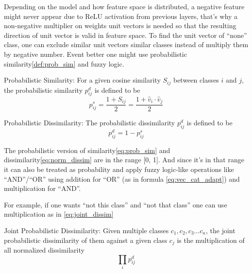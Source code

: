 Depending on the model and how feature space is distributed,
a negative feature might never appear due to ReLU activation from previous layers,
that's why a non-negative multiplier on weights unit vectors is needed
so that the resulting direction of unit vector is valid in feature space.
To find the unit vector of ``none'' class, one can exclude similar unit vectors similar classes
instead of multiply them by negative number.
Event better one might use probabilistic similarity\ref{def:prob_sim} and fuzzy logic.

\begin{definition}{Probabilistic Similarity:}
For a given cosine similarity \(S_{ij}\) between classes \(i\) and \(j\),
the probabilistic similarity \(p^d_{ij}\) is defined to be
\begin{equation}
p^s_{ij} = \frac{1+S_{ij}}{2} = \frac{ 1+\hat{v}_{i}\cdot \hat{v}_{j} }{2}
\label{eq:prob_sim}
\end{equation}
\label{def:prob_sim}
\end{definition}

\begin{definition}{Probabilistic Dissimilarity:}
The probabilistic dissimilarity \(p^d_{ij}\) is defined to be
\begin{equation}
p^d_{ij} = 1 - p^s_{ij}
\label{eq:prob_dissim}
\end{equation}
\label{def:prob_dissim}
\end{definition}

The probabilistic version of similarity\ref{eq:prob_sim} and dissimilarity\ref{eq:norm_dissim} are in the range [0, 1].
And since it's in that range it can also be treated as probability
and apply fuzzy logic-like operations like ``AND''/``OR'' using addition for ``OR'' (as in formula \ref{eq:vec_cat_adapt})
and multiplication for ``AND''.

For example, if one wants ``not this class'' and ``not that class''
one can use multiplication as in \ref{eq:joint_dissim}

\begin{definition}{Joint Probabilistic Dissimilarity:}
Given multiple classes \(c_1,c_2,c_3 \ldots c_n\), the joint probabilistic dissimilarity of them against a given class \(c_j\)
is the multiplication of all normalized dissimilarity
\begin{equation}
\prod_{i} p^d_{ij}
\label{eq:joint_dissim}
\end{equation}
\label{def:joint_dissim}
\end{definition}



